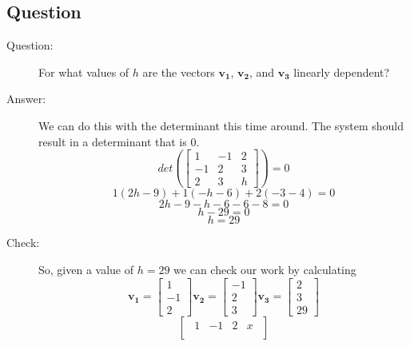 \documentclass{article}
\begin{document}
        \subsection{Question}
            \begin{description}
                \item[Question:]
                    For what values of $h$ are the vectors 
                    $\mathbf{v_1}$, $\mathbf{v_2}$, and $\mathbf{v_3}$ 
                    linearly dependent?
                \item[Answer:]
                    We can do this with the determinant this time around. The system
                    should result in a determinant that is $0$.
                    \[
                    det(
                        \begin{bmatrix}
                            1 & -1 & 2 \\
                            -1 & 2 & 3 \\
                            2 & 3 & h
                        \end{bmatrix}
                    )
                    =0
                    \]
                    \[
                    1(2h-9)+1(-h-6)+2(-3-4)=0
                    \]
                    \[
                    2h-9-h-6-6-8=0
                    \]
                    \[
                    h-29=0
                    \]
                    \[
                    h=29
                    \]
                \item[Check:]
                    So, given a value of $h=29$ we can check our work by calculating
                    \[
                    \mathbf{v_1}=\begin{bmatrix}1\\-1\\2\end{bmatrix}
                    \mathbf{v_2}=\begin{bmatrix}-1\\2\\3\end{bmatrix}
                    \mathbf{v_3}=\begin{bmatrix}2\\3\\29\end{bmatrix}
                    \]
                    \[
                    \begin{bmatrix}
                    \begin{array}{ccc|c}
                        1  & -1 & 2 & x \\

\end{array}
\end{bmatrix}\]
\end{description}
\end{document}
